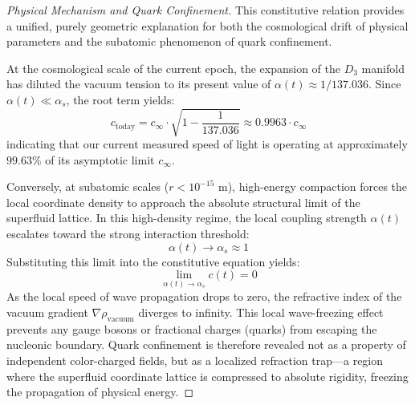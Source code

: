 \documentclass[11pt,a4paper]{article}
\theoremstyle{plain}
\theoremstyle{definition}
\theoremstyle{remark}
\begin{document}
\begin{proof}[Physical Mechanism and Quark Confinement]
This constitutive relation provides a unified, purely geometric explanation for both the cosmological drift of physical parameters and the subatomic phenomenon of quark confinement.

At the cosmological scale of the current epoch, the expansion of the $D_3$ manifold has diluted the vacuum tension to its present value of $\alpha(t) \approx 1/137.036$. Since $\alpha(t) \ll \alpha_s$, the root term yields:
\begin{equation}
c_{\text{today}} = c_{\infty} \cdot \sqrt{1 - \frac{1}{137.036}} \approx 0.9963 \cdot c_{\infty}
\end{equation}
indicating that our current measured speed of light is operating at approximately $99.63\%$ of its asymptotic limit $c_{\infty}$.

Conversely, at subatomic scales ($r < 10^{-15}\text{ m}$), high-energy compaction forces the local coordinate density to approach the absolute structural limit of the superfluid lattice. In this high-density regime, the local coupling strength $\alpha(t)$ escalates toward the strong interaction threshold:
\begin{equation}
\alpha(t) \to \alpha_s \approx 1
\end{equation}
Substituting this limit into the constitutive equation yields:
\begin{equation}
\lim_{\alpha(t) \to \alpha_s} c(t) = 0
\end{equation}
As the local speed of wave propagation drops to zero, the refractive index of the vacuum gradient $\nabla \rho_{\text{vacuum}}$ diverges to infinity. This local wave-freezing effect prevents any gauge bosons or fractional charges (quarks) from escaping the nucleonic boundary. Quark confinement is therefore revealed not as a property of independent color-charged fields, but as a localized refraction trap—a region where the superfluid coordinate lattice is compressed to absolute rigidity, freezing the propagation of physical energy.
\end{proof}
\end{document}
